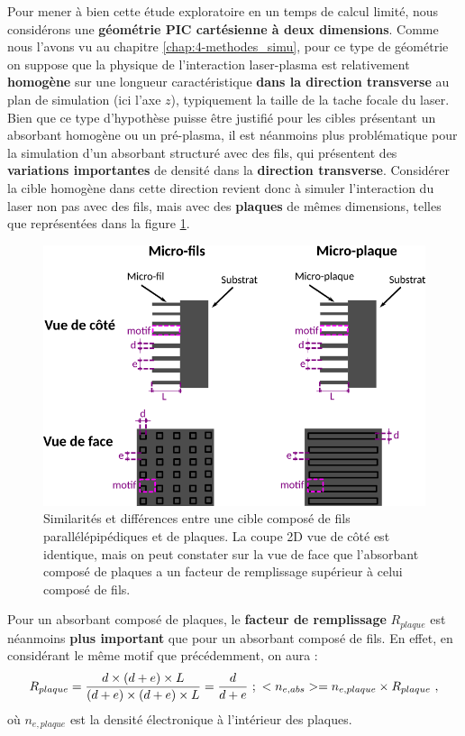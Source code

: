 \begin{refsection}
Pour mener à bien cette étude exploratoire en un temps de calcul limité, nous considérons une \textbf{géométrie PIC cartésienne à deux dimensions}. Comme nous l'avons vu au chapitre \ref{chap:4-methodes_simu}, pour ce type de géométrie on suppose que la physique de l'interaction laser-plasma est relativement \textbf{homogène} sur une longueur caractéristique \textbf{dans la direction transverse} au plan de simulation (ici l'axe $z$), typiquement la taille de la tache focale du laser. Bien que ce type d'hypothèse puisse être justifié pour les cibles présentant un absorbant homogène ou un pré-plasma, il est néanmoins plus problématique pour la simulation d'un absorbant structuré avec des fils, qui présentent des \textbf{variations importantes} de densité dans la \textbf{direction transverse}. Considérer la cible homogène dans cette direction revient donc à simuler l'interaction du laser non pas avec des fils, mais avec des \textbf{plaques} de mêmes dimensions, telles que représentées dans la figure \ref{fig:62-fils_vs_plaques}.

\begin{figure}[hbtp]
	\centering
	\includegraphics[width=0.7\linewidth]{6-opti_numerique/fils_vs_plaques.png}
    \caption{Similarités et différences entre une cible composé de fils parallélépipédiques et de plaques. La coupe 2D vue de côté est identique, mais on peut constater sur la vue de face que l'absorbant composé de plaques a un facteur de remplissage supérieur à celui composé de fils.}
	\label{fig:62-fils_vs_plaques}
\end{figure}

Pour un absorbant composé de plaques, le \textbf{facteur de remplissage} $R_{plaque}$ est néanmoins \textbf{plus important} que pour un absorbant composé de fils. En effet, en considérant le même motif que précédemment, on aura :
\begin{equation}
R_{plaque} =\dfrac{d \times (d+e) \times L}{(d+e) \times (d+e) \times L} = \frac{d}{d+e} ~ ; ~
<n_{e,abs}> = n_{e,plaque} \times R_{plaque} ~ \rm ,
\end{equation}
où $n_{e,plaque}$ est la densité électronique à l'intérieur des plaques.


\end{refsection}
